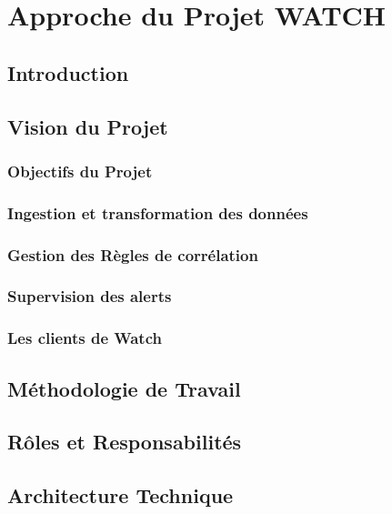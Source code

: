 \chapter{Approche du Projet WATCH}

\section{Introduction}

\section{Vision du Projet}

\subsection{Objectifs du Projet}

\subsection{Ingestion et transformation des données}

\subsection{Gestion des Règles de corrélation}

\subsection{Supervision des alerts}

\subsection{Les clients de Watch}

\section{Méthodologie de Travail}

\section{Rôles et Responsabilités}

\section{Architecture Technique}

